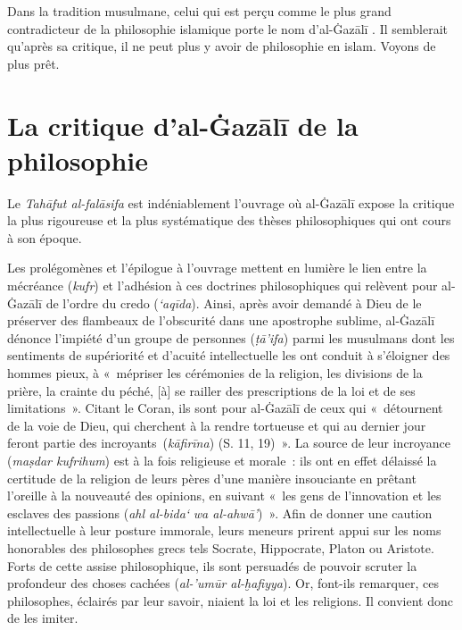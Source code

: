 Dans la tradition musulmane, celui qui est perçu comme le plus grand
contradicteur de la philosophie islamique porte le nom d'al-Ġazālī  \label{theol:AlGazali2}. Il
semblerait qu'après sa critique, il ne peut plus y avoir de philosophie
en islam. Voyons de plus prêt.


\section{La critique d'al-Ġazālī de la
philosophie}

Le \emph{Tahāfut al-falāsifa} est indéniablement l'ouvrage où al-Ġazālī \label{theol:AlGazali3}
expose la critique la plus rigoureuse et la plus systématique des thèses
philosophiques qui ont cours à son époque.

Les prolégomènes et l'épilogue à l'ouvrage mettent en lumière le lien
entre la mécréance (\emph{kufr}) et l'adhésion à ces doctrines
philosophiques qui relèvent pour al-Ġazālī de l'ordre du credo
(\emph{`aqīda}). Ainsi, après avoir demandé à Dieu de le préserver des
flambeaux de l'obscurité dans une apostrophe sublime, al-Ġazālī dénonce
l'impiété d'un groupe de personnes (\emph{ṭā'ifa}) parmi les musulmans
dont les sentiments de supériorité et d'acuité intellectuelle les ont
conduit à s'éloigner des hommes pieux, à «~mépriser les cérémonies de la
religion, les divisions de la prière, la crainte du péché, {[}à{]} se
railler des prescriptions de la loi et de ses limitations~». Citant le Coran, ils sont pour
al-Ġazālī de ceux qui «~détournent de la voie de Dieu, qui cherchent à
la rendre tortueuse et qui au dernier jour feront partie des
incroyants~(\emph{kāfirīna}) (S. 11, 19)~». La source de leur incroyance (\emph{maṣdar kufrihum}) est à la
fois religieuse et morale~: ils ont en effet délaissé la certitude de la
religion de leurs pères d'une manière insouciante en prêtant l'oreille à
la nouveauté des opinions, en suivant «~les gens de l'innovation et les
esclaves des passions (\emph{ahl al-bida`} \emph{wa
al-ahwā'})~». Afin de
donner une caution intellectuelle à leur posture immorale, leurs meneurs
prirent appui sur les noms honorables des philosophes grecs tels
Socrate, Hippocrate, Platon ou Aristote. Forts de cette assise
philosophique, ils sont persuadés de pouvoir scruter la profondeur des
choses cachées (\emph{al-'umūr al-ḫafiyya}). Or, font-ils remarquer, ces
philosophes, éclairés par leur savoir, niaient la loi et les religions.
Il convient donc de les imiter.

